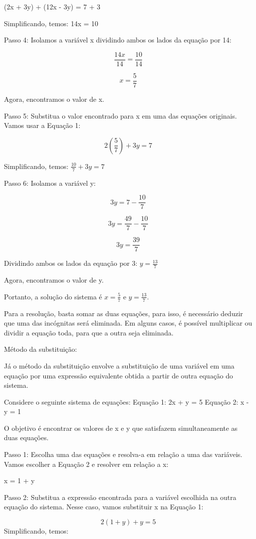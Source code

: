 (2x + 3y) + (12x - 3y) = 7 + 3

Simplificando, temos: 14x = 10

Passo 4: Isolamos a variável x dividindo ambos os lados da equação por
14:

$$\frac {14x}{14} = \frac {10}{14}$$

$$x = \frac {5}{7}$$

Agora, encontramos o valor de x.

Passo 5: Substitua o valor encontrado para x em uma das equações
originais. Vamos usar a Equação 1:

$$2(\frac {5}{7}) + 3y = 7$$

Simplificando, temos: $\frac {10}{7} + 3y = 7$

Passo 6: Isolamos a variável y:

$$3y = 7 - \frac {10}{7}$$

$$3y = \frac {49}{7} - \frac {10}{7}$$

$$3y = \frac {39}{7}$$

Dividindo ambos os lados da equação por 3: $y = \frac {13}{7}$

Agora, encontramos o valor de y.

Portanto, a solução do sistema é $x = \frac {5}{7}$ e $y =
\frac {13}{7}$.

Para a resolução, basta somar as duas equações, para isso, é necessário
deduzir que uma das incógnitas será eliminada. Em alguns casos, é
possível multiplicar ou dividir a equação toda, para que a outra seja
eliminada.

Método da substituição:

Já o método da substituição envolve a substituição de uma variável em
uma equação por uma expressão equivalente obtida a partir de outra
equação do sistema.

Considere o seguinte sistema de equações: Equação 1: 2x + y = 5 Equação
2: x - y = 1

O objetivo é encontrar os valores de x e y que satisfazem
simultaneamente as duas equações.

Passo 1: Escolha uma das equações e resolva-a em relação a uma das
variáveis. Vamos escolher a Equação 2 e resolver em relação a x:

x = 1 + y

Passo 2: Substitua a expressão encontrada para a variável escolhida na
outra equação do sistema. Nesse caso, vamos substituir x na Equação 1:

$$2(1 + y) + y = 5$$
Simplificando, temos: 

